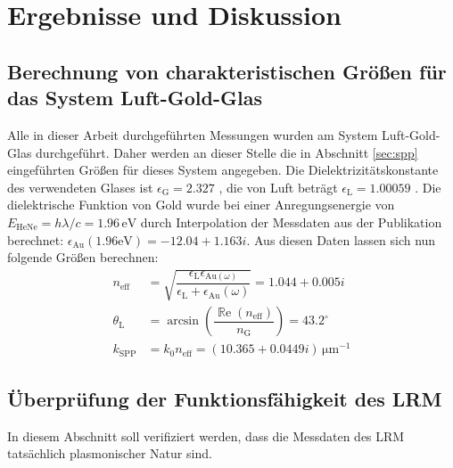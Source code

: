 \documentclass[titlepage,  ngerman]{article}
\renewcommand{\Re}{\operatorname{\mathbb{R}e}}
\begin{document}
	\section{Ergebnisse und Diskussion}
	\subsection{Berechnung von charakteristischen Größen für das System Luft-Gold-Glas}
		Alle in dieser Arbeit durchgeführten Messungen wurden am System Luft-Gold-Glas durchgeführt. Daher werden an dieser Stelle die in Abschnitt \ref{sec:spp} eingeführten Größen für dieses System angegeben. Die Dielektrizitätskonstante des verwendeten Glases ist $\epsilon_{\mathrm{G}} = 2.327$ \cite{Zeiss.}, die von Luft beträgt $\epsilon_{\mathrm{L}} = 1.00059$ \cite{Hippel.1995}. Die dielektrische Funktion von Gold wurde bei einer Anregungsenergie von $E_{\mathrm{HeNe}} = h\lambda/c = 1.96\,\mathrm{eV} $ durch Interpolation der Messdaten aus der Publikation \cite{Olmon.2012} berechnet: $\epsilon_{\mathrm{Au}}(1.96\mathrm{eV}) = -12.04 +1.163i$. Aus diesen Daten lassen sich nun folgende Größen berechnen:
		\begin{subequations}
			\begin{align}
				n_{\mathrm{eff}} &= \sqrt{\dfrac{\epsilon_{\mathrm{L}}\epsilon_{\mathrm{Au}(\omega)}}{\epsilon_{\mathrm{L}} + 	\epsilon_{\mathrm{Au}}(\omega)}} = 	1.044 + 0.005i \label{eq:theo_n_eff}\\			
				\theta_\mathrm{L} &=  \arcsin\left(\dfrac{\Re(n_{\mathrm{eff}})}{ n_\mathrm{G}}\right) = 43.2^\circ 
				\label{eq:theo_theta_l}\\
				k_{\mathrm{SPP}} &= k_0 n_{\mathrm{eff}} = (10.365 + 0.0449i)\,\mathrm{\mu m}^{-1}\label{eq:theo_k_spp}
			\end{align}
		\end{subequations}
	
	\subsection{Überprüfung der Funktionsfähigkeit des LRM}
	In diesem Abschnitt soll verifiziert werden, dass die Messdaten des LRM tatsächlich plasmonischer Natur sind.
\end{document}
